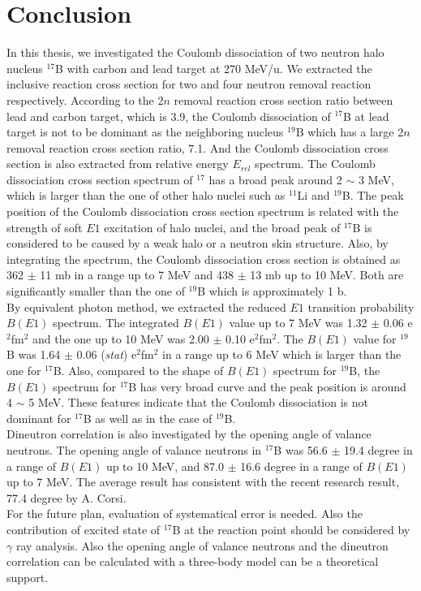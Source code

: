 \chapter{Conclusion}
In this thesis, we investigated the Coulomb dissociation of two neutron halo nucleus ${}^{17}$B with carbon and lead target at 270 MeV/u. We extracted the inclusive reaction cross section for two and four neutron removal reaction respectively. According to the 2$n$ removal reaction cross section ratio between lead and carbon target, which is 3.9, the Coulomb dissociation of $^{17}$B at lead target is not to be dominant as the neighboring nucleus $^{19}$B which has a large 2$n$ removal reaction cross section ratio, 7.1\cite{KJCook}. And the Coulomb dissociation cross section is also extracted from relative energy $E_{rel}$ spectrum. The Coulomb dissociation cross section spectrum of $^{17}$ has a broad peak around 2 $\sim$ 3 MeV, which is larger than the one of other halo nuclei such as ${}^{11}$Li\cite{Nakamura06} and $^{19}$B\cite{KJCook}. The peak position of the Coulomb dissociation cross section spectrum is related with the strength of soft $E1$ excitation of halo nuclei, and the broad peak of $^{17}$B is considered to be caused by a weak halo or a neutron skin structure. Also, by integrating the spectrum, the Coulomb dissociation cross section is obtained as 362 $\pm$ 11 mb in a range up to 7 MeV and 438 $\pm$ 13 mb up to 10 MeV. Both are significantly smaller than the one of ${}^{19}$B which is approximately 1 b\cite{KJCook}.\\
By equivalent photon method, we extracted the reduced $E1$ transition probability $B(E1)$ spectrum. The integrated $B(E1)$ value up to 7 MeV was 1.32 $\pm$ 0.06 e$^2$fm$^2$ and the one up to 10 MeV was 2.00 $\pm$ 0.10 e$^2$fm$^2$. The $B(E1)$ value for $^{19}$B was 1.64 $\pm$ 0.06 (\textit{stat}) e$^2$fm$^2$ in a range up to 6 MeV\cite{KJCook} which is larger than the one for $^{17}$B. Also, compared to the shape of $B(E1)$ spectrum for $^{19}$B, the $B(E1)$ spectrum for $^{17}$B has very broad curve and the peak position is around 4 $\sim$ 5 MeV. These features indicate that the Coulomb dissociation is not dominant for $^{17}$B as well as in the case of $^{19}$B. \\
Dineutron correlation is also investigated by the opening angle of valance neutrons. The opening angle of valance neutrons in $^{17}$B was 56.6 $\pm$ 19.4 degree in a range of $B(E1)$ up to 10 MeV, and 87.0 $\pm$ 16.6 degree in a range of $B(E1)$ up to 7 MeV. The average result has consistent with the recent research result, 77.4 degree by A. Corsi\cite{Corsi}. \\
For the future plan, evaluation of systematical error is needed. Also the contribution of excited state of $^{17}$B at the reaction point should be considered by $\gamma$ ray analysis. Also the opening angle of valance neutrons and the dineutron correlation can be calculated with a three-body model can be a theoretical support. 